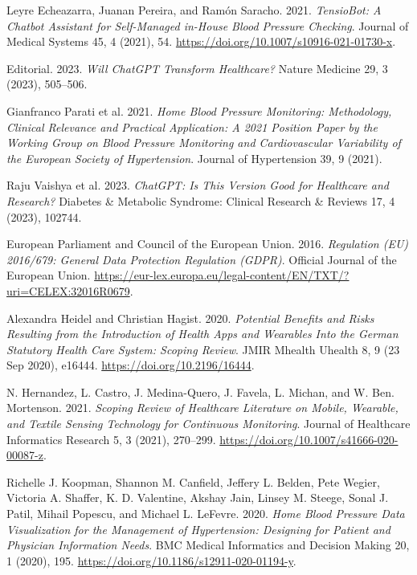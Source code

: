 \begin{thebibliography}{55}
Leyre Echeazarra, Juanan Pereira, and Ramón Saracho. 2021. \emph{TensioBot: A Chatbot Assistant for Self-Managed in-House Blood Pressure Checking}. Journal of Medical Systems 45, 4 (2021), 54. \url{https://doi.org/10.1007/s10916-021-01730-x}.

Editorial. 2023. \emph{Will ChatGPT Transform Healthcare?} Nature Medicine 29, 3 (2023), 505--506.

Gianfranco Parati et al. 2021. \emph{Home Blood Pressure Monitoring: Methodology, Clinical Relevance and Practical Application: A 2021 Position Paper by the Working Group on Blood Pressure Monitoring and Cardiovascular Variability of the European Society of Hypertension}. Journal of Hypertension 39, 9 (2021).

Raju Vaishya et al. 2023. \emph{ChatGPT: Is This Version Good for Healthcare and Research?} Diabetes \& Metabolic Syndrome: Clinical Research \& Reviews 17, 4 (2023), 102744.

European Parliament and Council of the European Union. 2016. \emph{Regulation (EU) 2016/679: General Data Protection Regulation (GDPR)}. Official Journal of the European Union. \url{https://eur-lex.europa.eu/legal-content/EN/TXT/?uri=CELEX:32016R0679}.

Alexandra Heidel and Christian Hagist. 2020. \emph{Potential Benefits and Risks Resulting from the Introduction of Health Apps and Wearables Into the German Statutory Health Care System: Scoping Review}. JMIR Mhealth Uhealth 8, 9 (23 Sep 2020), e16444. \url{https://doi.org/10.2196/16444}.

N. Hernandez, L. Castro, J. Medina-Quero, J. Favela, L. Michan, and W. Ben. Mortenson. 2021. \emph{Scoping Review of Healthcare Literature on Mobile, Wearable, and Textile Sensing Technology for Continuous Monitoring}. Journal of Healthcare Informatics Research 5, 3 (2021), 270--299. \url{https://doi.org/10.1007/s41666-020-00087-z}.

Richelle J. Koopman, Shannon M. Canfield, Jeffery L. Belden, Pete Wegier, Victoria A. Shaffer, K. D. Valentine, Akshay Jain, Linsey M. Steege, Sonal J. Patil, Mihail Popescu, and Michael L. LeFevre. 2020. \emph{Home Blood Pressure Data Visualization for the Management of Hypertension: Designing for Patient and Physician Information Needs}. BMC Medical Informatics and Decision Making 20, 1 (2020), 195. \url{https://doi.org/10.1186/s12911-020-01194-y}.


\end{thebibliography}
